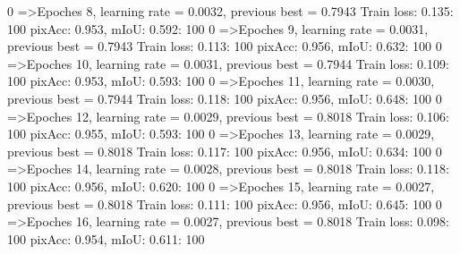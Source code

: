   0%
=>Epoches 8, learning rate = 0.0032,                 previous best = 0.7943
Train loss: 0.135: 100%
pixAcc: 0.953, mIoU: 0.592: 100%
  0%
=>Epoches 9, learning rate = 0.0031,                 previous best = 0.7943
Train loss: 0.113: 100%
pixAcc: 0.956, mIoU: 0.632: 100%
  0%
=>Epoches 10, learning rate = 0.0031,                 previous best = 0.7944
Train loss: 0.109: 100%
pixAcc: 0.953, mIoU: 0.593: 100%
  0%
=>Epoches 11, learning rate = 0.0030,                 previous best = 0.7944
Train loss: 0.118: 100%
pixAcc: 0.956, mIoU: 0.648: 100%
  0%
=>Epoches 12, learning rate = 0.0029,                 previous best = 0.8018
Train loss: 0.106: 100%
pixAcc: 0.955, mIoU: 0.593: 100%
  0%
=>Epoches 13, learning rate = 0.0029,                 previous best = 0.8018
Train loss: 0.117: 100%
pixAcc: 0.956, mIoU: 0.634: 100%
  0%
=>Epoches 14, learning rate = 0.0028,                 previous best = 0.8018
Train loss: 0.118: 100%
pixAcc: 0.956, mIoU: 0.620: 100%
  0%
=>Epoches 15, learning rate = 0.0027,                 previous best = 0.8018
Train loss: 0.111: 100%
pixAcc: 0.956, mIoU: 0.645: 100%
  0%
=>Epoches 16, learning rate = 0.0027,                 previous best = 0.8018
Train loss: 0.098: 100%
pixAcc: 0.954, mIoU: 0.611: 100%
